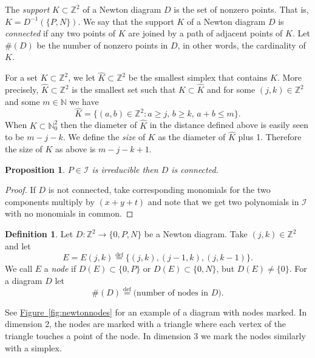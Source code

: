 \documentclass[12pt,openany]{book}
\newcommand{\Z}{{\mathbb{Z}}}
\newcommand{\N}{{\mathbb{N}}}
\newcommand{\sI}{{\mathcal{I}}}
\theoremstyle{plain}
\newtheorem{prop}[thm]{Proposition}
\theoremstyle{remark}
\theoremstyle{definition}
\newtheorem{defn}[thm]{Definition}
\theoremstyle{exercise}
\theoremstyle{example}
\newcommand{\figureref}[1]{\hyperref[#1]{Figure~\ref*{#1}}}
\begin{document}
The {\emph{support}} $K \subset \Z^2$ of a Newton diagram $D$ is the set
of nonzero points.  That is, $K = D^{-1}(\{ P, N \})$.
We say that the support $K$ of a Newton diagram $D$ is \emph{connected} if
any two points of $K$ are joined by a path of
adjacent points of $K$.
Let $\#(D)$ be the number of nonzero points in $D$, in other words, the
cardinality of $K$.

For a set $K \subset \Z^2$, we let $\widehat{K} \subset \Z^2$ be the smallest
simplex that contains $K$.
More precisely, $\widehat{K} \subset \Z^2$ is the
smallest
set such that $K \subset \widehat{K}$ and for some
$(j,k) \in \Z^2$
and some $m \in \N$ we have
\begin{equation}
\widehat{K} = \{(a,b) \in \Z^2 : a \geq j, \, b \geq k, \, a+b \leq m \}.
\end{equation}
When $K \subset \N_0^2$ then the diameter of $\widehat{K}$ in the distance defined above
is easily seen to be $m-j-k$.  We define the \emph{size} of $K$ as the diameter of
$\widehat{K}$ plus 1.  Therefore the size of $K$ as above is $m-j-k+1$.

\begin{prop}
$P \in \sI$ is irreducible then $D$ is connected.
\end{prop}

\begin{proof}
If $D$ is not connected, take corresponding monomials
for the two components multiply by $(x+y+t)$ and note that we
get two polynomials in $\sI$
with no monomials in common.
\end{proof}

\begin{defn}
Let $D \colon \Z^2 \to \{ 0, P, N \}$ be a Newton diagram.
Take $(j,k) \in \Z^2$
and let
\begin{equation}
E = E(j,k) \overset{\text{def}}{=} \{ (j,k) , (j-1,k) , (j,k-1) \} .
\end{equation}
We call $E$
a \emph{node} if
$D(E) \subset \{ 0, P \}$ or $D(E) \subset \{ 0, N \}$,
but $D(E) \not= \{ 0 \}$.
For a diagram $D$ let
\begin{equation}
\#(D) \overset{\text{def}}{=} \text{(number of nodes in $D$)} .
\end{equation}
\end{defn}

See \figureref{fig:newtonnodes} for an example of a diagram with nodes marked.
In dimension 2, the nodes are marked with a triangle where each vertex of the
triangle touches a point of the node.  In dimension 3 we mark the nodes
similarly with a simplex.
\end{document}
